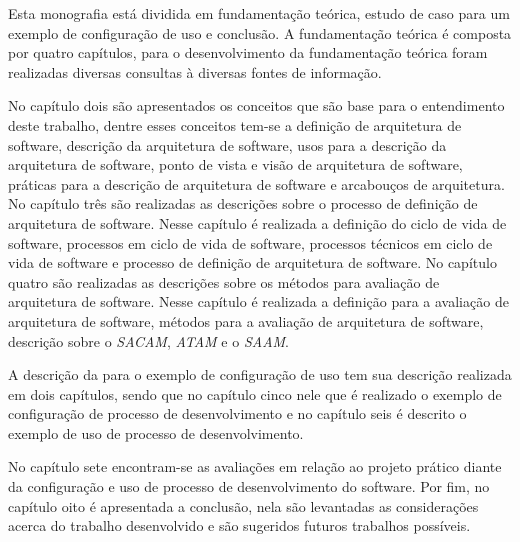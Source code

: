 Esta monografia está dividida em fundamentação teórica, estudo de caso para um exemplo de configuração de uso e conclusão.
A fundamentação teórica é composta por quatro capítulos, para o desenvolvimento da fundamentação teórica foram realizadas diversas consultas à diversas fontes de informação.

No capítulo dois são apresentados os conceitos que são base para o entendimento deste trabalho, dentre esses conceitos tem-se a definição de arquitetura de software, descrição da arquitetura de software, usos para a descrição da arquitetura de software, ponto de vista e visão de arquitetura de software, práticas para a descrição de arquitetura de software e arcabouços de arquitetura.
No capítulo três são realizadas as descrições sobre o processo de definição de arquitetura de software. Nesse capítulo é realizada a definição do ciclo de vida de software, processos em ciclo de vida de software, processos técnicos em ciclo de vida de software e processo de definição de arquitetura de software.
No capítulo quatro são realizadas as descrições sobre os métodos para avaliação de arquitetura de software. Nesse capítulo é realizada a definição para a avaliação de arquitetura de software, métodos para a avaliação de arquitetura de software, descrição sobre o \emph{\acrfull{SACAM}}, \emph{\acrfull{ATAM}} e o \emph{\acrfull{SAAM}}. 

A descrição da para o exemplo de configuração de uso tem sua descrição realizada em dois capítulos, sendo que no capítulo cinco nele que é realizado o exemplo de configuração de processo de desenvolvimento e no capítulo seis é descrito o exemplo de uso de processo de desenvolvimento.

No capítulo sete encontram-se as avaliações em relação ao projeto prático diante da configuração e uso de processo de desenvolvimento do software. Por fim, no capítulo oito é apresentada a conclusão, nela são levantadas as considerações acerca do trabalho desenvolvido e são sugeridos futuros trabalhos possíveis.